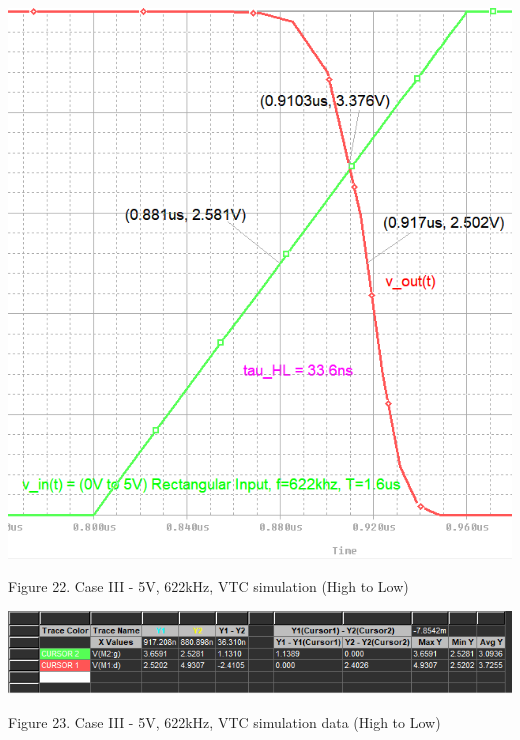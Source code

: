 \documentclass[conference]{IEEEtran}
\begin{document}
\begin{center}
    \centerline{\includegraphics[scale = 0.47]{figures/case3_results_HL.png}}
    Figure 22. Case III - 5V, 622kHz, VTC simulation (High to Low)
\end{center}

\begin{center}
    \centerline{\includegraphics[scale = 0.5]{figures/case3_results_HL_data.png}}
    Figure 23. Case III - 5V, 622kHz, VTC simulation data (High to Low)
\end{center} 
\end{document}
